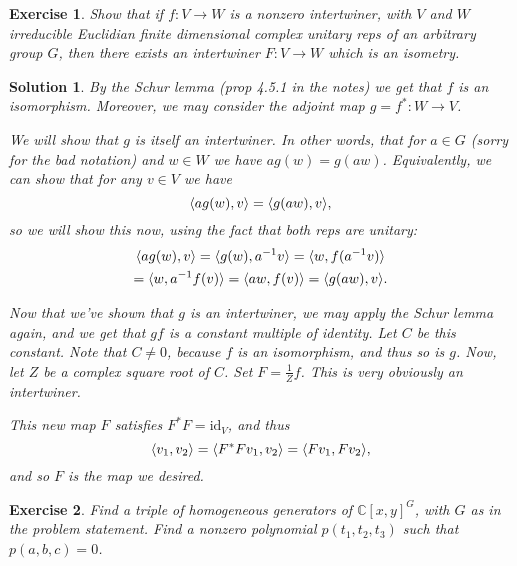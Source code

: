 \documentclass{article}
\newtheorem{ex}{Exercise}
\theoremstyle{nonumberplain}
\newtheorem{sol}{Solution}
\newcommand{\C}{\mathbb{C}}
\newcommand{\id}{\mathrm{id}}
\DeclarePairedDelimiter{\braket}{\langle}{\rangle}
\begin{document}
\pagebreak

\begin{ex}
Show that if $f \colon V \to W$ is a nonzero intertwiner, with $V$ and $W$ irreducible Euclidian finite dimensional complex unitary reps of an arbitrary group $G$, then there exists an intertwiner $F \colon V \to W$ which is an isometry.
\end{ex}

\begin{sol}
By the Schur lemma (prop 4.5.1 in the notes) we get that $f$ is an isomorphism. Moreover, we may consider the adjoint map $g = f^* \colon W \to V$.

We will show that $g$ is itself an intertwiner. In other words, that for $a \in G$ (sorry for the bad notation) and $w \in W$ we have $a g(w) = g(a w)$. Equivalently, we can show that for any $v \in V$ we have
\begin{equation}
\braket{a g(w), v} = \braket{g(a w), v},
\end{equation}
so we will show this now, using the fact that both reps are unitary:
\begin{multline}
\braket{a g(w), v} = \braket{g(w), a^{-1} v} = \braket{w, f(a^{-1} v)}\\ = \braket{w, a^{-1} f(v)} = \braket{a w, f(v)} = \braket{g(a w), v}.
\end{multline}

Now that we've shown that $g$ is an intertwiner, we may apply the Schur lemma again, and we get that $g f$ is a constant multiple of identity. Let $C$ be this constant. Note that $C \neq 0$, because $f$ is an isomorphism, and thus so is $g$. Now, let $Z$ be a complex square root of $C$. Set $F = \frac1Z f$. This is very obviously an intertwiner.

This new map $F$ satisfies $F^* F = \id_V$, and thus
\begin{equation}
\braket{v_1, v_2} = \braket{F^* F v_1, v_2} = \braket{F v_1, F v_2},
\end{equation}
and so $F$ is the map we desired.
\end{sol}

\pagebreak

\begin{ex}
Find a triple of homogeneous generators of $\C[x,y]^G$, with $G$ as in the problem statement. Find a nonzero polynomial $p(t_1, t_2, t_3)$ such that $p(a,b,c) = 0$.
\end{ex}
\end{document}
